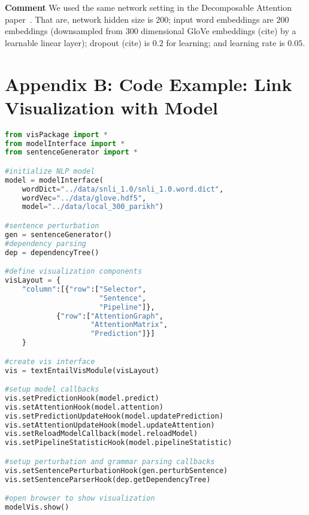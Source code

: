\documentclass[review,journal]{vgtc}         %
\newcommand{\taoli}[1]{\textcolor{orange}{[#1]}}
\begin{document}

\textbf{Comment} We used the same network setting in the Decomposable Attention paper~\cite{parikh2016emnlp}. That are, network hidden size is $200$; input word embeddings are $200$ embeddings (downsampled from $300$ dimensional GloVe embeddings (cite) by a learnable linear layer); dropout (cite) is $0.2$ for learning; and learning rate is $0.05$.

\section{Appendix B: Code Example: Link Visualization with Model}
\begin{lstlisting}[language=Python, caption=Code for generating the visualization.]
from visPackage import *
from modelInterface import *
from sentenceGenerator import *

#initialize NLP model
model = modelInterface(
    wordDict="../data/snli_1.0/snli_1.0.word.dict",
    wordVec="../data/glove.hdf5", 
    model="../data/local_300_parikh")

#sentence perturbation
gen = sentenceGenerator()
#dependency parsing
dep = dependencyTree()

#define visualization components
visLayout = {
    "column":[{"row":["Selector", 
                      "Sentence", 
                      "Pipeline"]},
            {"row":["AttentionGraph", 
                    "AttentionMatrix", 
                    "Prediction"]}]
    }

#create vis interface
vis = textEntailVisModule(visLayout)

#setup model callbacks
vis.setPredictionHook(model.predict)
vis.setAttentionHook(model.attention)
vis.setPredictionUpdateHook(model.updatePrediction)
vis.setAttentionUpdateHook(model.updateAttention)
vis.setReloadModelCallback(model.reloadModel)
vis.setPipelineStatisticHook(model.pipelineStatistic)

#setup perturbation and grammar parsing callbacks
vis.setSentencePerturbationHook(gen.perturbSentence)
vis.setSentenceParserHook(dep.getDependencyTree)

#open browser to show visualization
modelVis.show()

\end{lstlisting}

%
%
%


\end{document}
